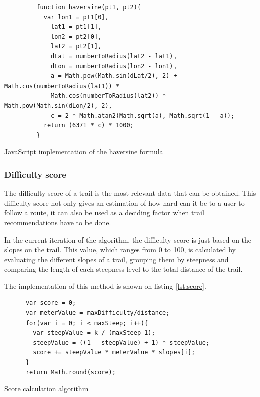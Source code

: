 \begin{listing}[ht]\centering
  \begin{minipage}{.9\textwidth}
    \begin{verbatim}
         function haversine(pt1, pt2){
           var lon1 = pt1[0],
             lat1 = pt1[1],
             lon2 = pt2[0],
             lat2 = pt2[1],
             dLat = numberToRadius(lat2 - lat1),
             dLon = numberToRadius(lon2 - lon1),
             a = Math.pow(Math.sin(dLat/2), 2) + Math.cos(numberToRadius(lat1)) *
             Math.cos(numberToRadius(lat2)) * Math.pow(Math.sin(dLon/2), 2),
             c = 2 * Math.atan2(Math.sqrt(a), Math.sqrt(1 - a));
           return (6371 * c) * 1000;
         }
    \end{verbatim}
  \end{minipage}
  \caption{JavaScript implementation of the haversine formula}\label{lst:haversine}
\end{listing}

\subsubsection*{Difficulty score}

The difficulty score of a trail is the most relevant data that can be obtained. This difficulty score not only gives an estimation of how hard can it be to a user to follow a route, it can also be used as a deciding factor when trail recommendations have to be done.

In the current iteration of the algorithm, the difficulty score is just based on the slopes on the trail. This value, which ranges from 0 to 100, is calculated by evaluating the different slopes of a trail, grouping them by steepness and comparing the length of each steepness level to the total distance of the trail.

The implementation of this method is shown on listing \ref{lst:score}.

\begin{listing}[ht]\centering
  \begin{minipage}{.7\textwidth}
    \begin{verbatim}
      var score = 0;
      var meterValue = maxDifficulty/distance;
      for(var i = 0; i < maxSteep; i++){
        var steepValue = k / (maxSteep-1);
        steepValue = ((1 - steepValue) + 1) * steepValue;
        score += steepValue * meterValue * slopes[i];
      }
      return Math.round(score);
    \end{verbatim}
  \end{minipage}
  \caption{Score calculation algorithm}\label{lst:score}
\end{listing}

